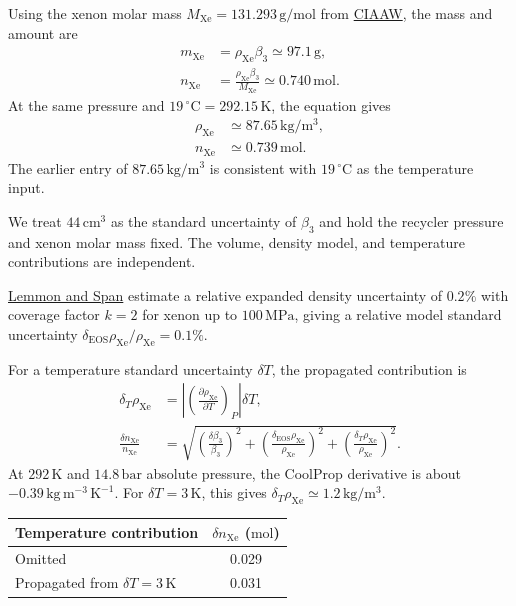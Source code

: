 \documentclass{article}
\begin{document}
Using the xenon molar mass $M_\mathrm{Xe}=131.293\,\mathrm{g/mol}$ from \href{https://ciaaw.org/xenon.htm}{CIAAW}, the mass and amount are
\begin{align}
    m_\mathrm{Xe} &= \rho_\mathrm{Xe}\beta_3\simeq 97.1\,\mathrm g, \\
    n_\mathrm{Xe} &= \frac{\rho_\mathrm{Xe}\beta_3}{M_\mathrm{Xe}}\simeq 0.740\,\mathrm{mol}.
\end{align}
At the same pressure and $19\,^\circ\mathrm C=292.15\,\mathrm K$, the equation gives
\begin{align*}
    \rho_\mathrm{Xe} &\simeq 87.65\,\mathrm{kg/m^3}, \\
    n_\mathrm{Xe} &\simeq 0.739\,\mathrm{mol}.
\end{align*}
The earlier entry of $87.65\,\mathrm{kg/m^3}$ is consistent with $19\,^\circ\mathrm C$ as the temperature input.

\begin{keyidea}
    We treat $44\,\mathrm{cm^3}$ as the standard uncertainty of $\beta_3$ and hold the recycler pressure and xenon molar mass fixed. The volume, density model, and temperature contributions are independent.
\end{keyidea}

\href{https://doi.org/10.1021/je050186n}{Lemmon and Span} estimate a relative expanded density uncertainty of $0.2\%$ with coverage factor $k=2$ for xenon up to $100\,\mathrm{MPa}$, giving a relative model standard uncertainty $\delta_\mathrm{EOS}\rho_\mathrm{Xe}/\rho_\mathrm{Xe}=0.1\%$.

For a temperature standard uncertainty $\delta T$, the propagated contribution is
\begin{align}
    \delta_T\rho_\mathrm{Xe} &= \left|\left(\frac{\partial\rho_\mathrm{Xe}}{\partial T}\right)_P\right|\delta T, \\
    \frac{\delta n_\mathrm{Xe}}{n_\mathrm{Xe}} &= \sqrt{\left(\frac{\delta\beta_3}{\beta_3}\right)^2 + \left(\frac{\delta_\mathrm{EOS}\rho_\mathrm{Xe}}{\rho_\mathrm{Xe}}\right)^2 + \left(\frac{\delta_T\rho_\mathrm{Xe}}{\rho_\mathrm{Xe}}\right)^2}.
\end{align}
At $292\,\mathrm K$ and $14.8\,\mathrm{bar}$ absolute pressure, the CoolProp derivative is about $-0.39\,\mathrm{kg\,m^{-3}\,K^{-1}}$. For $\delta T=3\,\mathrm K$, this gives $\delta_T\rho_\mathrm{Xe}\simeq 1.2\,\mathrm{kg/m^3}$.

\begin{center}
\begin{tabular}{lc}
Temperature contribution & $\delta n_\mathrm{Xe}$ ($\mathrm{mol}$) \\
\hline
Omitted & 0.029 \\
Propagated from $\delta T=3\,\mathrm K$ & 0.031
\end{tabular}
\end{center}
\end{document}
